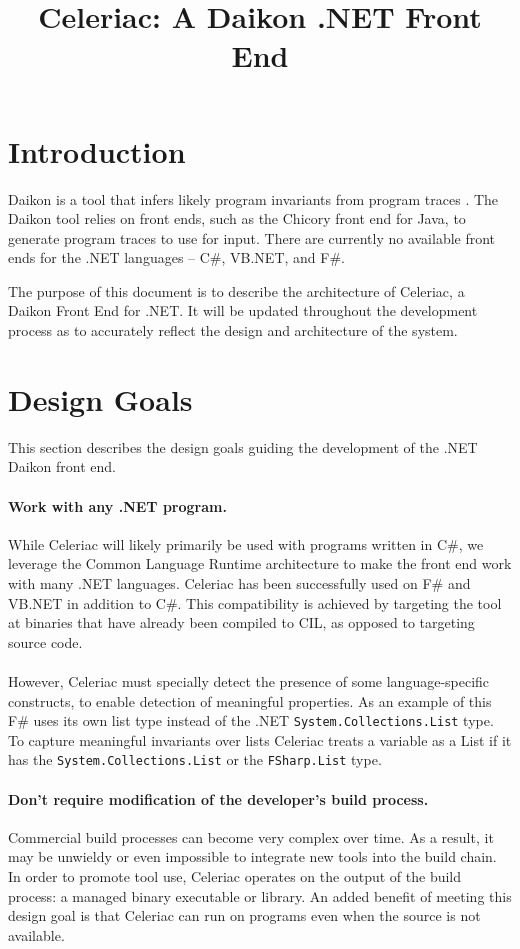 \documentclass{article}
\title{Celeriac: A Daikon .NET Front End}
\begin{document}
\maketitle

\section{Introduction}
Daikon is a tool that infers likely program invariants from program traces \cite{DaikonUserManual:Online}. The Daikon tool relies on front ends, such as the Chicory front end for Java, to generate program traces to use for input. There are currently no available front ends for the .NET languages -- C\#, VB.NET, and F\#.

The purpose of this document is to describe the architecture of Celeriac, a Daikon Front End for .NET. It will be updated throughout the development process as to accurately reflect the design and architecture of the system.

\section{Design Goals}
This section describes the design goals guiding the development of the .NET Daikon front end.

\paragraph{Work with any .NET program.}
While Celeriac will likely primarily be used with programs written in C\#, we leverage the Common Language Runtime architecture to make the front end work with many .NET languages. Celeriac has been successfully used on F\# and VB.NET in addition to C\#. This compatibility is achieved by targeting the tool at binaries that have already been compiled to CIL, as opposed to targeting source code.
\\ \\
However, Celeriac must specially detect the presence of some language-specific constructs, to enable detection of meaningful properties. As an example of this F\# uses its own list type instead of the .NET \texttt{System.Collections.List} type. To capture meaningful invariants over lists Celeriac treats a variable as a List if it has the \texttt{System.Collections.List} or the \texttt{FSharp.List} type.

\paragraph{Don't require modification of the developer's build process.}
Commercial build processes can become very complex over time. As a result, it may be unwieldy or even impossible to integrate new tools into the build chain. In order to promote tool use, Celeriac operates on the output of the build process: a managed binary executable or library. An added benefit of meeting this design goal is that Celeriac can run on programs even when the source is not available.
\end{document}
